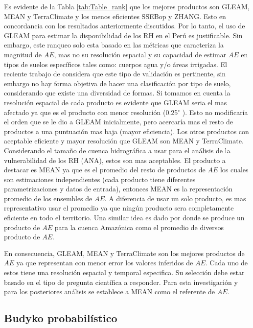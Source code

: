 \documentclass[12pt]{article}
\begin{document}
Es evidente de la Tabla \ref{tab:Table_rank} que los mejores productos son GLEAM, MEAN y TerraClimate y los menos eficientes SSEBop y ZHANG. Esto en concordancia con los resultados anteriormente discutidos. Por lo tanto, el uso de GLEAM para estimar la disponibilidad de los RH en el Perú es justificable. Sin embargo, este ranqueo solo esta basado en las métricas que caracteriza la magnitud de $AE$, mas no su resolución espacial y su capacidad de estimar $AE$ en tipos de suelos específicos tales como: cuerpos agua y/o áreas irrigadas. El reciente trabajo de \citet{Weerasinghe2019discuss} considera que este tipo de validación es pertinente, sin embargo no hay forma objetiva de hacer una clasificación por tipo de suelo, considerando que existe una diversidad de formas. Si tomamos en cuenta la resolución espacial de cada producto es evidente que GLEAM seria el mas afectado ya que es el producto con menor resolución (0.25$^{\circ}$ ). Esto no modificaría el orden que se le dio a GLEAM inicialmente, pero acercaría mas el resto de productos a una puntuación mas baja (mayor eficiencia). Los otros productos con aceptable eficiente y mayor resolución que GLEAM son MEAN y TerraClimate. Considerando el tamaño de cuenca hidrográfica a usar para el análisis de la vulnerabilidad de los RH (ANA), estos son mas aceptables. El producto a destacar es MEAN ya que es el promedio del resto de productos de $AE$ los cuales son estimaciones independientes (cada producto tiene diferentes parametrizaciones y datos de entrada), entonces MEAN es la representación promedio de los ensembles de $AE$. A diferencia de usar un solo producto, es mas representativo usar el promedio ya que ningún producto sera completamente eficiente en todo el territorio. Una similar idea es dado por \citet{da2019spatial} donde se produce un producto de $AE$ para la cuenca Amazónica como el promedio de diversos producto de $AE$.

En consecuencia, GLEAM, MEAN y TerraClimate son los mejores productos de $AE$ ya que representan con menor error los valores inferidos de $AE$. Cada uno de estos tiene una resolución espacial y temporal especifica. Su selección debe estar basado en el tipo de pregunta científica a responder. Para esta investigación y para los posteriores análisis se establece a MEAN como el referente de $AE$.

\subsection{Budyko probabilístico}
\end{document}

